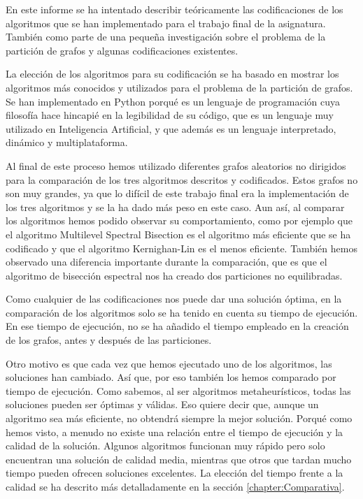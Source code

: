 En este informe se ha intentado describir teóricamente las codificaciones de los algoritmos que se han implementado para el trabajo final de la asignatura. También como parte de una pequeña investigación sobre el problema de la partición de grafos y algunas codificaciones existentes.

La elección de los algoritmos para su codificación se ha basado en mostrar los algoritmos más conocidos y utilizados para el problema de la partición de grafos. Se han implementado en Python porqué es un lenguaje de programación cuya filosofía hace hincapié en la legibilidad de su código, que es un lenguaje muy utilizado en Inteligencia Artificial, y que además es un lenguaje interpretado, dinámico y multiplataforma. 

Al final de este proceso hemos utilizado diferentes grafos aleatorios no dirigidos para la comparación de los tres algoritmos descritos y codificados. Estos grafos no son muy grandes, ya que lo difícil de este trabajo final era la implementación de los tres algoritmos y se la ha dado más peso en este caso. Aun así, al comparar los algoritmos hemos podido observar su comportamiento, como por ejemplo que el algoritmo Multilevel Spectral Bisection es el algoritmo más eficiente que se ha codificado y que el algoritmo Kernighan-Lin es el menos eficiente. También hemos observado una diferencia importante durante la comparación, que es que el algoritmo de bisección espectral nos ha creado dos particiones no equilibradas.

Como cualquier de las codificaciones nos puede dar una solución óptima, en la comparación de los algoritmos solo se ha tenido en cuenta su tiempo de ejecución. En ese tiempo de ejecución, no se ha añadido el tiempo empleado en la creación de los grafos, antes y después de las particiones. 

Otro motivo es que cada vez que hemos ejecutado uno de los algoritmos, las soluciones han cambiado. Así que, por eso también los hemos comparado por tiempo de ejecución. Como sabemos, al ser algoritmos metaheurísticos, todas las soluciones pueden ser óptimas y válidas. Eso quiere decir que, aunque un algoritmo sea más eficiente, no obtendrá siempre la mejor solución. Porqué como hemos visto, a menudo no existe una relación entre el tiempo de ejecución y la calidad de la solución. Algunos algoritmos funcionan muy rápido pero solo encuentran una solución de calidad media, mientras que otros que tardan mucho tiempo pueden ofrecen soluciones excelentes. La elección del tiempo frente a la calidad se ha descrito más detalladamente en la sección \ref{chapter:Comparativa}.

